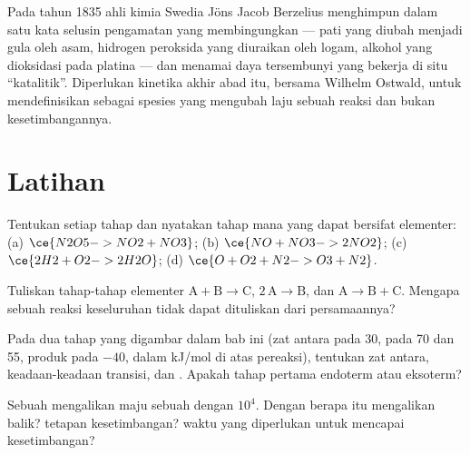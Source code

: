 \begin{history}[Katalisis, 1835]
Pada tahun 1835 ahli kimia Swedia Jöns Jacob Berzelius menghimpun dalam
satu kata selusin pengamatan yang membingungkan --- pati yang diubah
menjadi gula oleh asam, hidrogen peroksida yang diuraikan oleh logam,
alkohol yang dioksidasi pada platina --- dan menamai daya tersembunyi
yang bekerja di situ ``katalitik''. Diperlukan kinetika akhir abad itu,
bersama Wilhelm Ostwald, untuk mendefinisikan  sebagai spesies
yang mengubah laju sebuah reaksi dan bukan kesetimbangannya.
\end{history}

\section{Latihan}

\begin{exercise}[$\star$]\label{exo:b1:elementary-steps:1}
Tentukan  setiap tahap dan nyatakan tahap mana yang dapat bersifat elementer:
(a) $\ce{N2O5 -> NO2 + NO3}$; (b) $\ce{NO + NO3 -> 2NO2}$;
(c) $\ce{2H2 + O2 -> 2H2O}$; (d) $\ce{O + O2 + N2 -> O3 + N2}$.
\end{exercise}

\begin{exercise}[$\star$]\label{exo:b1:elementary-steps:2}
Tuliskan  tahap-tahap elementer $\mathrm{A} + \mathrm{B} \to
\mathrm{C}$, $2\,\mathrm{A} \to \mathrm{B}$, dan $\mathrm{A} \to \mathrm{B} +
\mathrm{C}$. Mengapa  sebuah reaksi keseluruhan tidak dapat
dituliskan dari persamaannya?
\end{exercise}

\begin{exercise}[$\star$]\label{exo:b1:elementary-steps:3}
Pada  dua tahap yang digambar dalam bab ini (zat antara pada
30,  pada 70 dan 55, produk pada $-40$, dalam
\unit{kJ/mol} di atas pereaksi), tentukan zat antara, keadaan-keadaan
transisi, dan . Apakah tahap pertama endoterm atau eksoterm?
\end{exercise}

\begin{exercise}[$\star$]\label{exo:b1:elementary-steps:4}
Sebuah  mengalikan  maju sebuah 
dengan $10^4$. Dengan berapa  itu mengalikan  balik?
tetapan kesetimbangan? waktu yang diperlukan untuk mencapai kesetimbangan?
\end{exercise}

